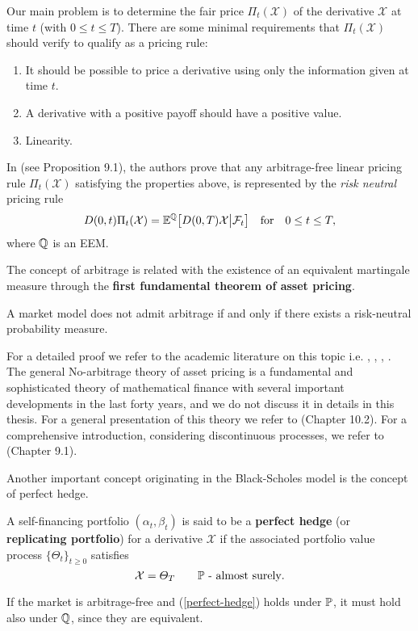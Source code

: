 Our main problem is to determine the
fair price $\Pi_t(\mathcal{X})$ of the derivative $\mathcal{X}$ at time $t$ (with $0 \leq t \leq T$).
There are some minimal requirements that $\Pi_t(\mathcal{X})$ should verify to qualify as a pricing rule:
\begin{enumerate}
 \item It should be possible to price a derivative using only the information given at time $t$.
 \item A derivative with a positive payoff should have a positive value.
 \item Linearity.
\end{enumerate}
In \cite{Cont} (see Proposition 9.1), the authors prove that any arbitrage-free linear pricing rule $\Pi_t(\mathcal{X})$ satisfying the properties above, 
is represented by the \emph{risk neutral} pricing rule
\begin{equation}\label{derivative_price}
 D(0,t) \Pi_t(\mathcal{X}) = \mathbb{E}^{\mathbb{Q}} \bigl[ D(0,T) \mathcal{X} \big| \mathcal{F}_t \bigr] \quad \mbox{for} \quad 0\leq t \leq T,
\end{equation}
where $\mathbb{Q}$ is an EEM.

The concept of arbitrage is related with the existence of an equivalent martingale measure through the \textbf{first fundamental theorem of asset pricing}.
\begin{Theorem}
 A market model does not admit arbitrage if and only if there exists a risk-neutral probability measure. 
\end{Theorem}
For a detailed proof we refer to the academic literature on this topic i.e. \cite{HaKr79}, \cite{HaPl81}, \cite{Sch02}, \cite{DelSch98}.
The general No-arbitrage theory of asset pricing is a fundamental and sophisticated theory of mathematical finance with several important developments 
in the last forty years, and we do not discuss it in details in this thesis.
For a general presentation of this theory we refer to \cite{Bjork} (Chapter 10.2). For a comprehensive introduction, 
considering discontinuous processes, we refer to \cite{Cont} (Chapter 9.1).

Another important concept originating in the Black-Scholes model is the concept of perfect hedge.
\begin{Definition}
 A self-financing portfolio $(\alpha_t,\beta_t)$ is said to be a \textbf{perfect hedge} (or \textbf{replicating portfolio}) for a derivative  
 $\mathcal{X}$ if the associated portfolio value process $\{\varTheta_t\}_{t\geq0}$ satisfies
 \begin{equation}\label{perfect-hedge}
    \mathcal{X}  = \varTheta_T   \quad \quad \mathbb{P} \mbox{ - almost surely}. 
  \end{equation}
\end{Definition}
If the market is arbitrage-free and
(\ref{perfect-hedge}) holds under $\mathbb{P}$, it must hold also under $\mathbb{Q}$, since they are equivalent.

